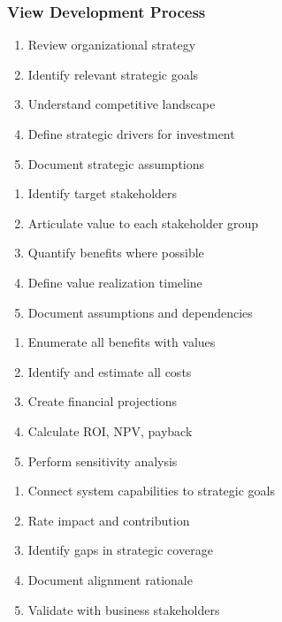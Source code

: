 \documentclass[11pt,letterpaper]{article}
\begin{document}
\subsubsection{View Development Process}

\begin{guidancebox}
\begin{enumerate}[nosep]
    \item Review organizational strategy
    \item Identify relevant strategic goals
    \item Understand competitive landscape
    \item Define strategic drivers for investment
    \item Document strategic assumptions
\end{enumerate}
\end{guidancebox}

\begin{guidancebox}
\begin{enumerate}[nosep]
    \item Identify target stakeholders
    \item Articulate value to each stakeholder group
    \item Quantify benefits where possible
    \item Define value realization timeline
    \item Document assumptions and dependencies
\end{enumerate}
\end{guidancebox}

\begin{guidancebox}
\begin{enumerate}[nosep]
    \item Enumerate all benefits with values
    \item Identify and estimate all costs
    \item Create financial projections
    \item Calculate ROI, NPV, payback
    \item Perform sensitivity analysis
\end{enumerate}
\end{guidancebox}

\begin{guidancebox}
\begin{enumerate}[nosep]
    \item Connect system capabilities to strategic goals
    \item Rate impact and contribution
    \item Identify gaps in strategic coverage
    \item Document alignment rationale
    \item Validate with business stakeholders
\end{enumerate}
\end{guidancebox}
\end{document}
